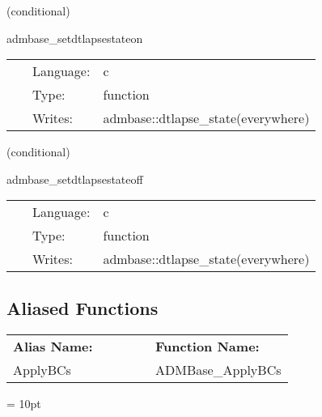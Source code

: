 \vspace{5mm}

   (conditional) 

\hspace{5mm} admbase\_setdtlapsestateon 

\hspace{5mm}{\it set the dtlapse\_state variable to 1 } 


\hspace{5mm}

 \begin{tabular*}{160mm}{cll} 
~ & Language:  & c \\ 
~ & Type:  & function \\ 
~ & Writes:  & admbase::dtlapse\_state(everywhere) \\ 
\end{tabular*} 


\vspace{5mm}

   (conditional) 

\hspace{5mm} admbase\_setdtlapsestateoff 

\hspace{5mm}{\it set the dtlapse\_state variable to 0 } 


\hspace{5mm}

 \begin{tabular*}{160mm}{cll} 
~ & Language:  & c \\ 
~ & Type:  & function \\ 
~ & Writes:  & admbase::dtlapse\_state(everywhere) \\ 
\end{tabular*} 


\subsection*{Aliased Functions}

\hspace{5mm}

 \begin{tabular*}{160mm}{ll} 

{\bf Alias Name:} ~~~~~~~ & {\bf Function Name:} \\ 
ApplyBCs & ADMBase\_ApplyBCs \\ 
\end{tabular*} 



\vspace{5mm}\parskip = 10pt 

